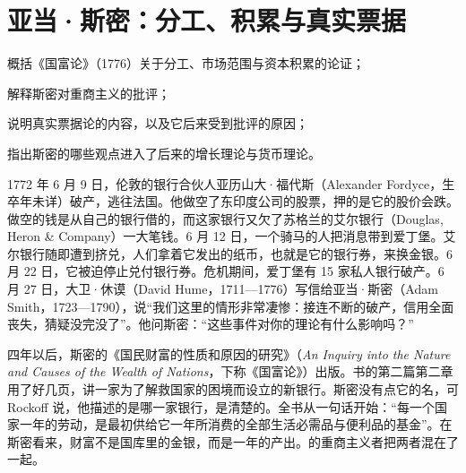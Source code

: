 \chapter{亚当·斯密：分工、积累与真实票据}\label{ch:smith}

\begin{chapterguide}
\begin{guidegoals}
\item 概括《国富论》（1776）关于分工、市场范围与资本积累的论证；
\item 解释斯密对重商主义的批评；
\item 说明真实票据论的内容，以及它后来受到批评的原因；
\item 指出斯密的哪些观点进入了后来的增长理论与货币理论。
\end{guidegoals}
\end{chapterguide}

1772 年 6 月 9 日，伦敦的银行合伙人亚历山大·福代斯（Alexander Fordyce，生卒年未详）破产，逃往法国。他做空了东印度公司的股票，押的是它的股价会跌。做空的钱是从自己的银行借的，而这家银行又欠了苏格兰的艾尔银行（Douglas, Heron \& Company）一大笔钱\cite{rockoff2009}。6 月 12 日，一个骑马的人把消息带到爱丁堡。艾尔银行随即遭到挤兑，人们拿着它发出的纸币，也就是它的银行券，来换金银。6 月 22 日，它被迫停止兑付银行券。危机期间，爱丁堡有 15 家私人银行破产\cite{rockoff2009}。6 月 27 日，大卫·休谟（David Hume，1711—1776）写信给亚当·斯密（Adam Smith，1723—1790），说“我们这里的情形非常凄惨：接连不断的破产，信用全面丧失，猜疑没完没了”。他问斯密：“这些事件对你的理论有什么影响吗？”\cite{rockoff2009}

四年以后，斯密的《国民财富的性质和原因的研究》（\emph{An Inquiry into the Nature and Causes of the Wealth of Nations}，下称《国富论》）出版。书的第二篇第二章用了好几页，讲一家为了解救国家的困境而设立的新银行。斯密没有点它的名，可 Rockoff 说，他描述的是哪一家银行，是清楚的\cite{smith1776,rockoff2009}。全书从一句话开始：“每一个国家一年的劳动，是最初供给它一年所消费的全部生活必需品与便利品的基金”\cite{smith1776}。在斯密看来，财富不是国库里的金银，而是一年的产出。的重商主义者把两者混在了一起。

